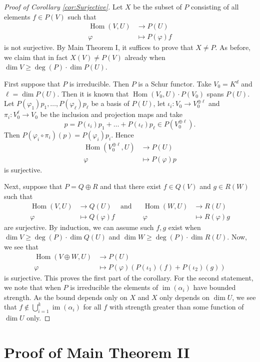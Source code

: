 \documentclass{amsart}
\theoremstyle{plain}
\theoremstyle{definition}
\DeclareMathOperator{\im}{im}
\renewcommand{\phi}{\varphi}
\DeclareMathOperator{\Hom}{Hom}
\begin{document}
\begin{proof}[Proof of Corollary \ref{cor:Surjective}]
Let $X$ be the subset of $P$ consisting of all elements $f\in P(V)$ such that
\begin{align*}
\Hom(V,U) &\to P(U)\\
\phi &\mapsto P(\phi)f
\end{align*}
is not surjective. By Main Theorem I, it suffices to prove that $X\neq P$. As before, we claim that in fact $X(V)\neq P(V)$ already when $\dim V\geq \deg(P)\cdot\dim P(U)$.

First suppose that $P$ is irreducible. Then $P$ is a Schur functor. Take $V_0=K^d$ and $\ell=\dim P(U)$. Then it is known that $\Hom(V_0,U)\cdot P(V_0)$ spans $P(U)$. Let $P(\phi_1)p_1,\ldots,P(\phi_\ell)p_{\ell}$ be a basis of $P(U)$, let $\iota_i\colon V_0\to V_0^{\oplus \ell}$ and $\pi_i\colon V_0^{\ell}\to V_0$ be the inclusion and projection maps and take
\[
p=P(\iota_i)p_1+\ldots+P(\iota_\ell)p_\ell\in P(V_0^{\oplus \ell}).
\]
Then $P(\phi_i\circ\pi_i)(p)=P(\phi_i)p_i$. Hence
\begin{align*}
\Hom(V_0^{\oplus\ell},U) &\to P(U)\\
\phi &\mapsto P(\phi)p
\end{align*}
is surjective.

Next, suppose that $P=Q\oplus R$ and that there exist $f\in Q(V)$ and $g\in R(W)$ such that
\begin{align*}
\Hom(V,U) &\to Q(U)&\mbox{and}&&\Hom(W,U) &\to R(U)\\
\phi &\mapsto Q(\phi)f&&&\phi&\mapsto R(\phi)g
\end{align*}
are surjective. By induction, we can assume such $f,g$ exist when $\dim V \geq \deg(P)\cdot \dim Q(U)$ and $\dim W\geq\deg(P)\cdot \dim R(U)$. Now, we see that
\begin{align*}
\Hom(V\oplus W,U) &\to P(U)\\
\phi &\mapsto P(\phi)(P(\iota_1)(f)+P(\iota_2)(g))
\end{align*}
is surjective. This proves the first part of the corollary. For the second statement, we note that when $P$ is irreducible the elements of $\im(\alpha_i)$ have bounded strength. As the bound depends only on $X$ and $X$ only depends on $\dim U$, we see that $f \not \in\bigcup_{i=1}^k \im(\alpha_i)$ for all $f$ with strength greater than some function of $\dim U$ only.
\end{proof}

\section{Proof of Main Theorem II} \label{sec:ProofII}
\end{document}
